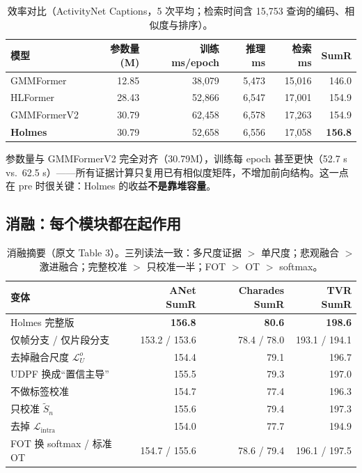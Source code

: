 \documentclass[11pt,a4paper,UTF8,fontset=windows]{ctexart}
\newcommand{\term}[1]{\textbf{#1}}
\begin{document}
\begin{table}[h]
\centering
\small
\begin{tabular}{@{}lrrrrr@{}}
\toprule
模型 & 参数量 (M) & 训练 ms/epoch & 推理 ms & 检索 ms & SumR \\
\midrule
GMMFormer & 12.85 & 38{,}079 & 5{,}473 & 15{,}016 & 146.0 \\
HLFormer & 28.43 & 52{,}866 & 6{,}547 & 17{,}001 & 154.9 \\
GMMFormerV2 & 30.79 & 62{,}458 & 6{,}578 & 17{,}263 & 154.9 \\
\textbf{Holmes} & 30.79 & 52{,}658 & 6{,}556 & 17{,}058 & \textbf{156.8} \\
\bottomrule
\end{tabular}
\caption{效率对比（ActivityNet Captions，5 次平均；检索时间含 15{,}753 查询的编码、相似度与排序）。}
\end{table}

参数量与 GMMFormerV2 完全对齐（30.79M），训练每 epoch 甚至更快（52.7 s vs.\ 62.5 s）——所有证据计算只复用已有相似度矩阵，不增加前向结构。这一点在 pre 时很关键：Holmes 的收益\term{不是靠堆容量}。

\subsection{消融：每个模块都在起作用}

\begin{table}[h]
\centering
\small
\begin{tabular}{@{}lrrr@{}}
\toprule
变体 & ANet SumR & Charades SumR & TVR SumR \\
\midrule
Holmes 完整版 & \textbf{156.8} & \textbf{80.6} & \textbf{198.6} \\
\midrule
仅帧分支 / 仅片段分支 & 153.2 / 153.6 & 78.4 / 78.0 & 193.1 / 194.1 \\
去掉融合尺度 $\mathcal{L}^o_U$ & 154.4 & 79.1 & 196.7 \\
UDPF 换成“置信主导” & 155.5 & 79.3 & 197.0 \\
不做标签校准 & 154.7 & 77.4 & 196.3 \\
只校准 $\tilde S_n$ & 155.6 & 79.4 & 197.3 \\
去掉 $\mathcal{L}_{\mathrm{intra}}$ & 154.0 & 77.7 & 194.9 \\
FOT 换 softmax / 标准 OT & 154.7 / 155.6 & 78.6 / 79.4 & 196.1 / 197.5 \\
\bottomrule
\end{tabular}
\caption{消融摘要（原文 Table 3）。三列读法一致：多尺度证据 $>$ 单尺度；悲观融合 $>$ 激进融合；完整校准 $>$ 只校准一半；FOT $>$ OT $>$ softmax。}
\end{table}
\end{document}
